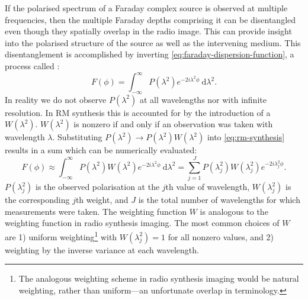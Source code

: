         If the polarised spectrum of a Faraday complex source is observed at multiple frequencies, then the multiple Faraday depths comprising it can be disentangled even though they spatially overlap in the radio image. This can provide insight into the polarised structure of the source as well as the intervening medium. This disentanglement is accomplished by inverting \autoref{eq:faraday-dispersion-function}, a process called  \citep{brentjens_faraday_2005}:
        \begin{equation}
            \label{eq:rm-synthesis}
            F(\phi) = \int_{-\infty}^\infty P(\lambda^2) e^{-2i\lambda^2\phi}\ \mathrm{d}\lambda^2.
        \end{equation}
        In reality we do not observe $P(\lambda^2)$ at all wavelengths nor with infinite resolution. In RM synthesis this is accounted for by the introduction of a  \citep[or , e.g.][]{heald_faraday_2009} $W(\lambda^2)$. $W(\lambda^2)$ is nonzero if and only if an observation was taken with wavelength $\lambda$. Substituting $P(\lambda^2) \to P(\lambda^2) W(\lambda^2)$ into \autoref{eq:rm-synthesis} results in a sum which can be numerically evaluated:
        \begin{equation}
            \label{eq:weighted-rm-synthesis}
            F(\phi) \approx \int_{-\infty}^\infty P(\lambda^2) W(\lambda^2) e^{-2i\lambda^2\phi}\ \mathrm{d}\lambda^2 = \sum_{j = 1}^J P(\lambda^2_j) W(\lambda^2_j) e^{-2i\lambda^2_j\phi}.
        \end{equation}
        $P(\lambda^2_j)$ is the observed polarisation at the $j$th value of wavelength, $W(\lambda^2_j)$ is the corresponding $j$th weight, and $J$ is the total number of wavelengths for which measurements were taken. The weighting function $W$ is analogous to the weighting function in radio synthesis imaging. The most common choices of $W$ are 1) uniform weighting\footnote{The analogous weighting scheme in radio synthesis imaging would be natural weighting, rather than uniform---an unfortunate overlap in terminology.} with $W(\lambda_j^2) = 1$ for all nonzero values, and 2) weighting by the inverse variance at each wavelength.

